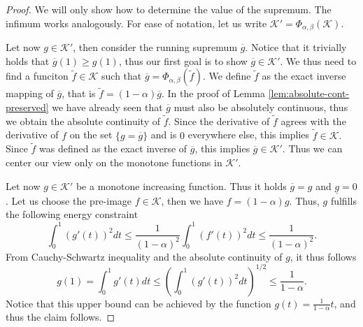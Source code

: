 \documentclass[10pt,a4paper]{amsart}
\begin{document}
\begin{proof}
    We will only show how to determine the value of the supremum. The infimum works analogously. For ease of notation, let us write  $\mathcal{K}'=\Phi_{\alpha,\beta}(\mathcal{K}).$

    Let now $g\in\mathcal{K}'$, then consider the running supremum $\overline{g}$. Notice that it trivially holds that $\overline{g}(1)\geq g(1)$, thus our first goal is to show $\overline{g}\in\mathcal{K}'.$ We thus need to find a funciton $\tilde{f}\in\mathcal{K}$ such that $\overline{g}=\Phi_{\alpha,\beta}(\tilde{f})$. We define $\tilde{f}$ as the exact inverse mapping of $\overline{g}$, that is
    $\tilde{f}=(1-\alpha)\overline{g}.$
    In the proof of Lemma \ref{lem:absolute-cont-preserved} we have already seen that $\overline{g}$ must also be absolutely continuous, thus we obtain the absolute continuity of $\tilde{f}$. Since the derivative of $\tilde{f}$ agrees with the derivative of $f$ on the set $\{g=\overline{g}\}$ and is $0$ everywhere else, this implies $\tilde{f}\in\mathcal{K}.$ Since $\tilde{f}$ was defined as the exact inverse of $\overline{g}$, this implies $\overline{g}\in\mathcal{K}'$. Thus we can center our view only on the monotone functions in $\mathcal{K}'$.

    Let now $g\in\mathcal{K}'$ be a monotone increasing function. Thus it holds $\overline{g}=g$ and $\underline{g}=0$. Let us choose the pre-image $f\in\mathcal{K}$, then we have
    $f=(1-\alpha)g.$
    Thus, $g$ fulfills the following energy constraint
    $$\int_0^1(g'(t))^2dt\leq \frac{1}{(1-\alpha)^2}\int_0^1(f'(t))^2dt\leq \frac{1}{(1-\alpha)^2}.$$
    From Cauchy-Schwartz inequality and the absolute continuity of $g$, it thus follows
    $$g(1)=\int_0^1g'(t)dt\leq\left(\int_0^1(g'(t))^2dt\right)^{1/2}\leq\frac{1}{1-\alpha}.$$
    Notice that this upper bound can be achieved by the function $g(t)=\frac{1}{1-\alpha}t$, and thus the claim follows.
\end{proof}
\end{document}
